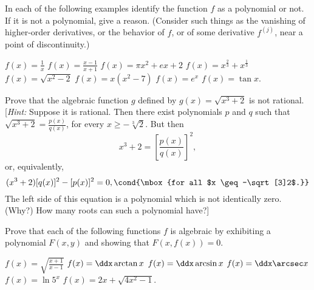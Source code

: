\begin{exercises}

In each of the following examples identify the
function $f$ as a polynomial or not.
If it is not a polynomial, give a reason.
(Consider such things as the vanishing of
higher-order derivatives, or the behavior of $f$,
or of some derivative $f^{(j)}$,
near a point of discontinuity.)
\begin{exenum}
\x
$f(x) = \frac1x$
\x
$f(x) = \frac{x-1}{x+1}$
\x
$f(x) = \pi x^2 + ex + 2$
\x
$f(x) = x^{\frac23} + x^{\frac13}$
\x
$f(x) = \sqrt{x^2-2}$
\x
$f(x) = x(x^2-7)$
\x
$f(x) = e^x$
\x
$f(x) = \tan x$.
\end{exenum}

Prove that the algebraic function $g$ defined by
$g(x) = \sqrt{x^3+2}$ is not rational.
[\emph{Hint:} Suppose it is rational.
Then there exist polynomials $p$ and $q$ such that
$\sqrt{x^3+2} = \frac{p(x)}{q(x)}$,
for every $x \geq -\sqrt[3]2$.  But then
\[
x^3+2 = \left[ \frac{p(x)}{q(x)} \right]^2
,
\]
or, equivalently,
\[
(x^3+2)[q(x)]^2 - [p(x)]^2 = 0,
\cond{\mbox{for all $x \geq -\sqrt[3]2$.}}
\]
The left side of this equation is a polynomial which
is not identically zero.
(Why?)
How many roots can such a polynomial have?]

Prove that each of the following functions $f$
is algebraic by exhibiting a polynomial
$F(x,y)$ and showing that $F(x,f(x)) = 0$.
\begin{exenum}
\x
$f(x) = \sqrt{\frac{x+1}{x-1}}$
\x
$f(x) = \ddx \arctan x$
\x
$f(x) = \ddx \arcsin x$
\x
$f(x) = \ddx \arcsec x$
\x
$f(x) = \ln 5^x$
\x
$f(x) = 2x + \sqrt{4x^2-1}$.
\end{exenum}

\end{exercises}
